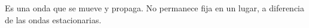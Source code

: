 Es una onda que se mueve y propaga. No permanece fija en un lugar, a diferencia de las ondas estacionarias.
